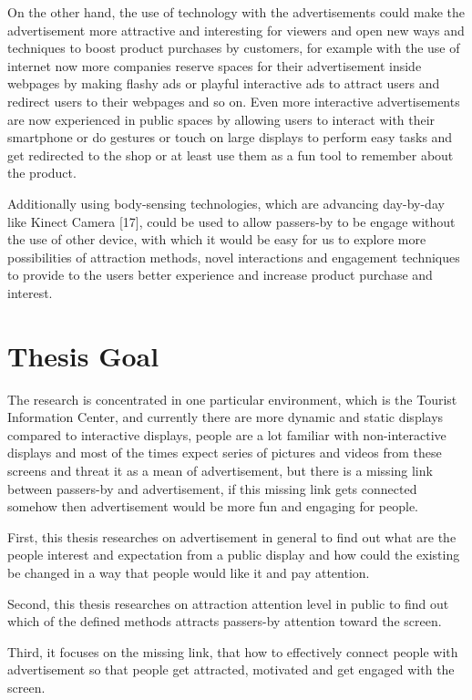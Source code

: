 On the other hand, the use of technology with the advertisements could make the advertisement more attractive and interesting for viewers and open new ways and techniques to boost product purchases by customers, for example with the use of internet now more companies reserve spaces for their advertisement inside webpages by making flashy ads or playful interactive ads to attract users and redirect users to their webpages and so on. Even more interactive advertisements are now experienced in public spaces by allowing users to interact with their smartphone or do gestures or touch on large displays to perform easy tasks and get redirected to the shop or at least use them as a fun tool to remember about the product.

Additionally using body-sensing technologies, which are advancing day-by-day like Kinect Camera [17], could be used to allow passers-by to be engage without the use of other device, with which it would be easy for us to explore more possibilities of attraction methods, novel interactions and engagement techniques to provide to the users better experience and increase product purchase and interest.

\section{Thesis Goal}
The research is concentrated in one particular environment, which is the Tourist Information Center, and currently there are more dynamic and static displays compared to interactive displays, people are a lot familiar with non-interactive displays and most of the times expect series of pictures and videos from these screens and threat it as a mean of advertisement, but there is a missing link between passers-by and advertisement, if this missing link gets connected somehow then advertisement would be more fun and engaging for people.

First, this thesis researches on advertisement in general to find out what are the people interest and expectation from a public display and how could the existing be changed in a way that people would like it and pay attention.

Second, this thesis researches on attraction attention level in public to find out which of the defined methods attracts passers-by attention toward the screen.

Third, it focuses on the missing link, that how to effectively connect people with advertisement so that people get attracted, motivated and get engaged with the screen.

